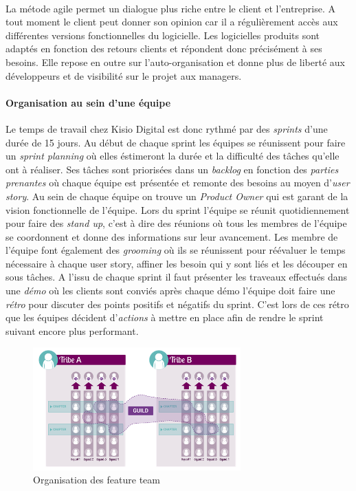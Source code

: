 \documentclass[a4paper]{report}
\begin{document}
\paragraph{} La métode agile permet un dialogue plus riche entre le client et l'entreprise. A tout moment le client peut donner son opinion car il a régulièrement accès aux différentes versions fonctionnelles du logicielle. Les logicielles produits sont adaptés en fonction des retours clients et répondent donc précisément à ses besoins. Elle repose en outre sur l'auto-organisation et donne plus de liberté aux développeurs et de visibilité sur le projet aux managers.


\paragraph {Organisation au sein d'une équipe} Le temps de travail chez Kisio Digital est donc rythmé par des \emph{sprints} d'une durée de 15 jours. Au début de chaque sprint les équipes se réunissent pour faire un \emph{sprint planning} où elles éstimeront la durée et la difficulté des tâches qu'elle ont à réaliser. Ses tâches sont priorisées dans un \emph{backlog} en fonction des \emph{parties prenantes} où chaque équipe est présentée et remonte des besoins au moyen d'\emph{user story}. Au sein de chaque équipe on trouve un \emph{Product Owner} qui est garant de la vision fonctionnelle de l'équipe. Lors du sprint l'équipe se réunit quotidiennement pour faire des \emph{stand up}, c'est à dire des réunions où tous les membres de l'équipe se coordonnent et donne des informations sur leur avancement. Les membre de l'équipe font également des \emph{grooming} où ils se réunissent pour réévaluer le temps nécessaire à chaque user story, affiner les besoin qui y sont liés et les découper en sous tâches. A l'issu de chaque sprint il faut présenter les traveaux effectués dans une \emph{démo} où les clients sont conviés après chaque démo l'équipe doit faire une \emph{rétro} pour discuter des points positifs et négatifs du sprint. C'est lors de ces rétro que les équipes décident d'\emph{actions} à mettre en place afin de rendre le sprint suivant encore plus performant.

\begin{figure}
		\includegraphics[width=8cm]{image/feature_team}
		\caption{Organisation des feature team}
		\label{Organisation des feature team}
\end{figure}
\end{document}

